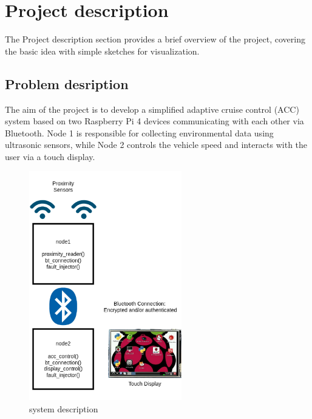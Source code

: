 \section{Project description}
\label{chapter1}

The Project description section provides a brief overview of the project, covering the basic idea with simple sketches for visualization.

\subsection{Problem desription}


The aim of the project is to develop a simplified adaptive cruise control (ACC) system based on two Raspberry Pi 4 devices communicating with each other via Bluetooth. Node 1 is responsible for collecting environmental data using ultrasonic sensors, while Node 2 controls the vehicle speed and interacts with the user via a touch display.

\begin{figure}[h]
	\includegraphics[height=100mm]{images/system}
	\centering
	\caption{system description}
	\label{fig:system}
\end{figure}

\paragraph{}

